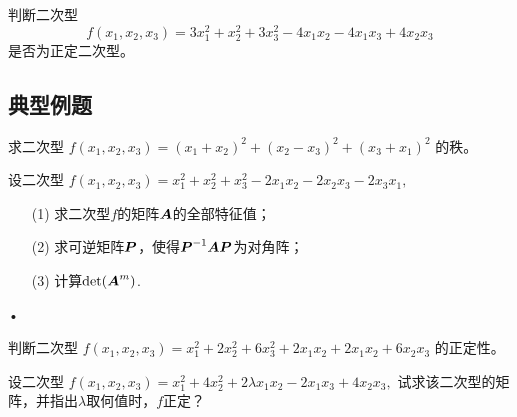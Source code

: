 \begin{frame}
    
  \begin{li}
    判断二次型
    $$
    f(x_1,x_2,x_3)=3x_1^2+x_2^2+3x_3^2-4x_1x_2-4x_1x_3+4x_2x_3
    $$
    是否为正定二次型。
  \end{li}
  
\end{frame}






\subsection{典型例题}


\begin{frame}
  
  \begin{li}[2005-2006第一学期]
    求二次型
    $
    f(x_1,x_2,x_3)=(x_1+x_2)^2+(x_2-x_3)^2+(x_3+x_1)^2
    $
    的秩。
  \end{li}
\end{frame}

\begin{frame}
  \begin{li}[2005-2006第一学期]
    设二次型
    $
    f(x_1,x_2,x_3)=x_1^2+x_2^2+x_3^2-2x_1x_2-2x_2x_3-2x_3x_1,
    $
    \begin{itemize}
    \item[(1)] 求二次型$f$的矩阵$\boldsymbol{A}$的全部特征值；
    \item[(2)] 求可逆矩阵$\boldsymbol{P}$，使得$\boldsymbol{P}^{-1}\boldsymbol{A}\boldsymbol{P}$为对角阵；
    \item[(3)] 计算$\mathrm{det}(\boldsymbol{A}^m)$.
    \end{itemize}•
  \end{li}  
\end{frame}


\begin{frame}  
  \begin{li}[2005-2006第二学期]
    判断二次型
    $
    f(x_1,x_2,x_3)=x_1^2+2x_2^2+6x_3^2+2x_1x_2+2x_1x_2+6x_2x_3
    $
    的正定性。
  \end{li}
\end{frame}

\begin{frame}
  \begin{li}[2006-2007第一学期]
    设二次型
    $
    f(x_1,x_2,x_3)=x_1^2+4x_2^2+2\lambda  x_1x_2-2x_1x_3+4x_2x_3,
    $
    试求该二次型的矩阵，并指出$\lambda$取何值时，$f$正定？
  \end{li}
  
\end{frame}


